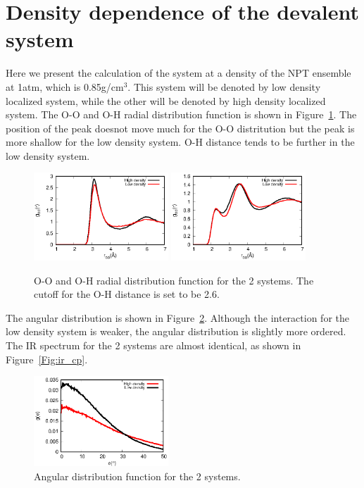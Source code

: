 \documentclass[aps,prl,reprint,amsmath,amssymb]{revtex4-1}
\begin{document}
\section{Density dependence of the devalent system} 


Here we present the calculation of the system at a density of the NPT ensemble at 1atm, which is 0.85g/cm$^3$. 
This system will be denoted by low density localized system, while the other will be denoted by high density localized system.
The O-O and O-H radial distribution function is shown in Figure~\ref{Fig:rdf_cp}. 
The position of the peak doesnot move much for the O-O distritution but the peak is more shallow for the low density system. 
O-H distance tends to be further in the low density system.

\begin{figure}
\includegraphics[width=0.45\textwidth]{cp_rdf}
\includegraphics[width=0.45\textwidth]{cp_oh_rdf}
\caption{O-O and O-H radial distribution function for the 2 systems. The cutoff for the O-H distance is set to be 2.6\Ang.}\label{Fig:rdf_cp}
\end{figure} 

The angular distribution is shown in Figure~\ref{Fig:adfcp}. 
Although the interaction for the low density system is weaker, the angular distribution is slightly more ordered. 
The IR spectrum for the 2 systems are almost identical, as shown in Figure~\ref{Fig:ir_cp}.

\begin{figure}
\includegraphics[width=0.45\textwidth]{cp_adf}
\caption{Angular distribution function for the 2 systems.}\label{Fig:adfcp}
\end{figure} 
\end{document}
